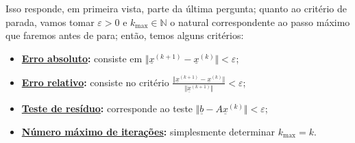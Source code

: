 \documentclass[../numerical_methods.tex]{subfiles}
\begin{document}
Isso responde, em primeira vista, parte da última pergunta; quanto ao critério de parada, vamos tomar \(\varepsilon > 0\) e \(k_{\mathrm{max}}\in \mathbb{N}\) o natural correspondente ao passo máximo que faremos antes de para; então, temos alguns critérios:
\begin{itemize}
	\item \textbf{\underline{Erro absoluto}:} consiste em \(\Vert \underline{x}^{(k+1)} - \underline{x}^{(k)} \Vert <\varepsilon \);
	\item \textbf{\underline{Erro relativo}:} consiste no critério \(\displaystyle \frac{\Vert \underline{x}^{(k+1)} - \underline{x}^{(k)} \Vert}{\Vert \underline{x}^{(k+1)} \Vert} < \varepsilon \);
	\item \textbf{\underline{Teste de resíduo}:} corresponde ao teste \(\Vert \underline{b} - A\underline{x}^{(k)} \Vert < \varepsilon \);
	\item \textbf{\underline{Número máximo de iterações}:} simplesmente determinar \(k_{\mathrm{max}} = k\).
\end{itemize}
\end{document}
